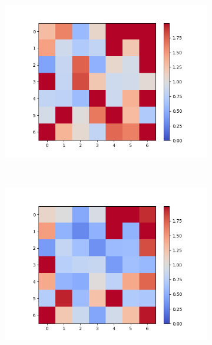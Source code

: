\begin{figure}
\centering
	\begin{subfigure}[b]{0.4\textwidth}
        \centering
        \includegraphics[scale=.4]{imagens/erros5pyrDown.png}
        \caption{}
    \end{subfigure}
    ~
    \begin{subfigure}[b]{0.4\textwidth}
        \centering
        \includegraphics[scale=.4]{imagens/erros4pyrDown.png}
        \caption{}
    \end{subfigure}\\
    

\end{figure}
